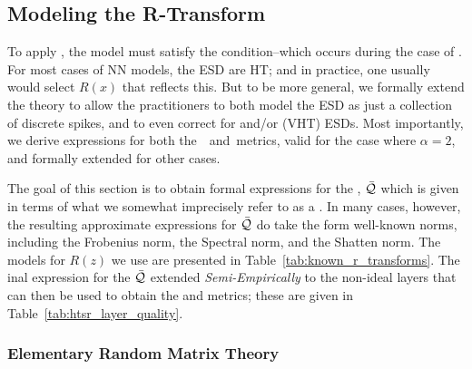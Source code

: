 \subsection{Modeling the R-Transform}
\label{sxn:r_transforms}

To apply \SETOL, the model must satisfy the \TRACELOG condition--which occurs during the case of \IdealLearning.
For most cases of NN models, the ESD are HT; and in practice, one usually would select $R(x)$ that reflects this.
But to be more general, we formally extend the theory to allow the practitioners to
both model the ESD as just a collection of discrete spikes, and to even correct for
\CorrelationTraps and/or \VeryHeavyTailed (VHT) ESDs.
Most importantly,  we derive expressions for both the~\WW~\ALPHA and~\ALPHAHAT metrics, valid
for the case \IdealLearning where $\alpha=2$, and formally extended for other cases.

The goal of this section is to obtain formal expressions for the \LayerQuality, $\bar{\mathcal{Q}}$ which is
given in terms of what we somewhat imprecisely refer to as a \GEN.
In many cases, however, the resulting approximate expressions for $\bar{\mathcal{Q}}$ do take the
form well-known norms, including the Frobenius norm, the Spectral norm, and the Shatten norm.
The models for $R(z)$  we use are presented in Table~\ref{tab:known_r_transforms}.
The inal expression for the \LayerQuality $\bar{\mathcal{Q}}$ extended \emph{Semi-Empirically} to the non-ideal layers that can then be used to obtain the \HTSR \ALPHA and \ALPHAHAT metrics; these are given in Table~\ref{tab:htsr_layer_quality}.

\subsubsection{Elementary Random Matrix Theory}
\label{sxn:r_transforms:elementary_rmt}

